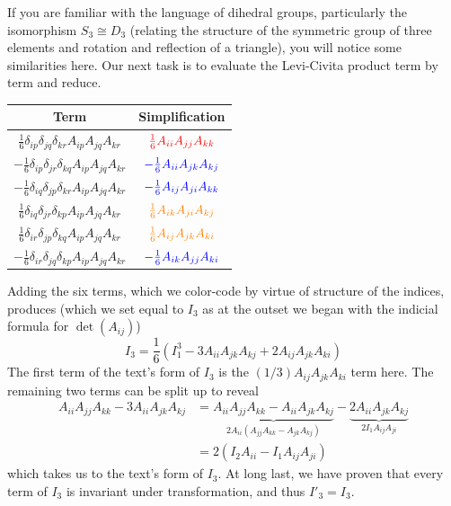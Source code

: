 \documentclass[a4paper]{article}
\begin{document}
If you are familiar with the language of dihedral groups, particularly the isomorphism \( S_{3} \cong D_{3} \) (relating the structure of the symmetric group of three elements and rotation and reflection of a triangle), you will notice some similarities here. Our next task is to evaluate the Levi-Civita product term by term and reduce.

\begin{center}
	\renewcommand{\arraystretch}{1.8}
	\setlength{\arraycolsep}{10pt}
	\begin{tabular}{|c||c|}
		\hline
		\rule[-1.2em]{0pt}{3em}
		Term & Simplification \\
		\hline\hline
		\rule[-1.2em]{0pt}{3em}
		\( \frac{1}{6}\delta_{ip}\delta_{jq}\delta_{kr}A_{ip}A_{jq}A_{kr} \) & \( \textcolor{red}{\frac{1}{6}A_{ii}A_{jj}A_{kk}} \) \\
		\hline
		\rule[-1.2em]{0pt}{3em}
		\( -\frac{1}{6}\delta_{ip}\delta_{jr}\delta_{kq}A_{ip}A_{jq}A_{kr} \) & \( \textcolor{blue}{-\frac{1}{6}A_{ii}A_{jk}A_{kj}} \) \\
		\hline
		\rule[-1.2em]{0pt}{3em}
		\( -\frac{1}{6}\delta_{iq}\delta_{jp}\delta_{kr}A_{ip}A_{jq}A_{kr} \) & \( \textcolor{blue}{-\frac{1}{6}A_{ij}A_{ji}A_{kk}} \) \\
		\hline
		\rule[-1.2em]{0pt}{3em}
		\( \frac{1}{6}\delta_{iq}\delta_{jr}\delta_{kp}A_{ip}A_{jq}A_{kr} \) & \( \textcolor{orange}{\frac{1}{6}A_{ik}A_{ji}A_{kj}} \) \\
		\hline
		\rule[-1.2em]{0pt}{3em}
		\( \frac{1}{6}\delta_{ir}\delta_{jp}\delta_{kq}A_{ip}A_{jq}A_{kr} \) & \( \textcolor{orange}{\frac{1}{6}A_{ij}A_{jk}A_{ki}} \) \\
		\hline
		\rule[-1.2em]{0pt}{3em}
				\( -\frac{1}{6}\delta_{ir}\delta_{jq}\delta_{kp}A_{ip}A_{jq}A_{kr} \) & \( \textcolor{blue}{-\frac{1}{6}A_{ik}A_{jj}A_{ki}} \) \\
		\hline
	\end{tabular}
\end{center}

Adding the six terms, which we color-code by virtue of structure of the indices, produces (which we set equal to \( I_{3} \) as at the outset we began with the indicial formula for \( \det \!\left( A_{ij} \right) \))
\[
	I_{3} = \frac{1}{6}\!\left( I^{3}_{1} - 3A_{ii}A_{jk}A_{kj} + 2A_{ij}A_{jk}A_{ki} \right)
\]
The first term of the text's form of \( I_{3} \) is the \( \!\left( 1/3 \right)A_{ij}A_{jk}A_{ki} \) term here. The remaining two terms can be split up to reveal
\begin{align*}
	A_{ii}A_{jj}A_{kk} - 3A_{ii}A_{jk}A_{kj} & = \underbrace{A_{ii}A_{jj}A_{kk} - A_{ii}A_{jk}A_{kj}}_{2A_{ii}\!\left( A_{jj}A_{kk} - A_{jk}A_{kj} \right)} - \underbrace{2A_{ii}A_{jk}A_{kj}}_{2I_{1}A_{ij}A_{ji}} \\
	 & = 2 \!\left( I_{2}A_{ii} - I_{1}A_{ij}A_{ji} \right)
\end{align*}
which takes us to the text's form of \( I_{3} \). At long last, we have proven that every term of \( I_{3} \) is invariant under transformation, and thus \( I'_{3} = I_{3} \).
\end{document}
